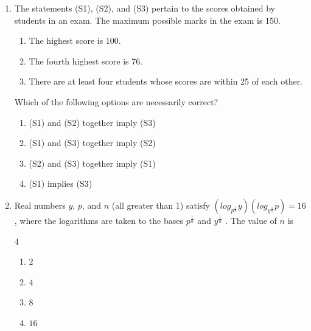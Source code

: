 \begin{enumerate}[label=\thesubsection.\arabic*,ref=\thesubsection.\theenumi]
\item The statements (S1), (S2), and (S3) pertain to the scores obtained by students in
an exam. The maximum possible marks in the exam is 150.
	\begin{enumerate}
		\item[(S1)] The highest score is 100.
		\item[(S2)] The fourth highest score is 76.
		\item[(S3)] There are at least four students whose scores are within 25 of each other.
	\end{enumerate}
Which of the following options are necessarily correct?
	
	\begin{enumerate}
		\item (S1) and (S2) together imply (S3)
		\item (S1) and (S3) together imply (S2)
		\item (S2) and (S3) together imply (S1)
		\item (S1) implies (S3)
	\end{enumerate}
	






\item Real numbers $y$, $p$, and $n$ (all greater than 1) satisfy
	$(log_{p^{\frac{1}{n}}} y)(log_{y^{\frac{1}{n}}} p) = 16$,
		where the logarithms are taken to the bases $p^{\frac{1}{n}}$ and $y^{\frac{1}{n}}$ .
The value of $n$ is
		\begin{multicols}{4}
			\begin{enumerate}
				\item $2$
				\item $4$
				\item $8$
				\item $16$
			\end{enumerate}
		\end{multicols}





\end{enumerate}
